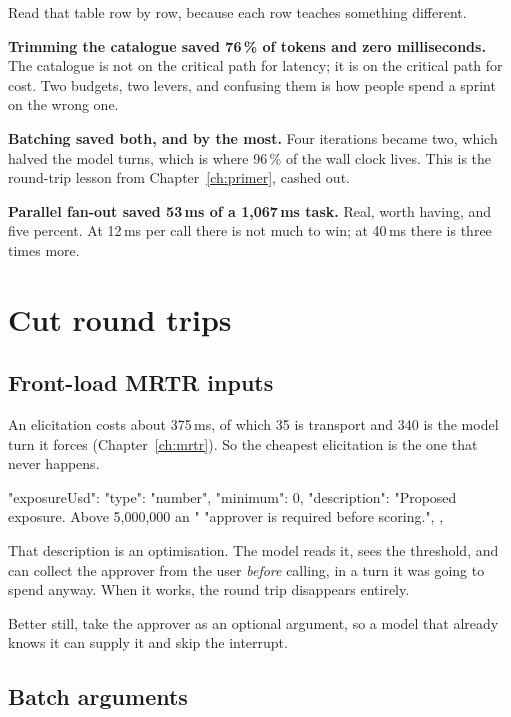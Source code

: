 Read that table row by row, because each row teaches something different.

\textbf{Trimming the catalogue saved 76\,\% of tokens and zero milliseconds.}
The catalogue is not on the critical path for latency; it is on the critical
path for cost. Two budgets, two levers, and confusing them is how people spend a
sprint on the wrong one.

\textbf{Batching saved both, and by the most.} Four iterations became two, which
halved the model turns, which is where 96\,\% of the wall clock lives. This is
the round-trip lesson from Chapter~\ref{ch:primer}, cashed out.

\textbf{Parallel fan-out saved 53\,ms of a 1,067\,ms task.} Real, worth having,
and five percent. At 12\,ms per call there is not much to win; at 40\,ms there
is three times more.


\section{Cut round trips}

\subsection{Front-load MRTR inputs}

An elicitation costs about 375\,ms, of which 35 is transport and 340 is the
model turn it forces (Chapter~\ref{ch:mrtr}). So the cheapest elicitation is the
one that never happens.

\begin{py}
"exposureUsd": {
    "type": "number", "minimum": 0,
    "description": "Proposed exposure. Above 5,000,000 an "
                   "approver is required before scoring.",
},
\end{py}

That description is an optimisation. The model reads it, sees the threshold, and
can collect the approver from the user \emph{before} calling, in a turn it was
going to spend anyway. When it works, the round trip disappears entirely.

Better still, take the approver as an optional argument, so a model that already
knows it can supply it and skip the interrupt.

\subsection{Batch arguments}

